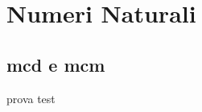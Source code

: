 \chapter{Numeri Naturali}
\label{cha:numerinaturali}
\section{mcd e mcm}
\label{sec:numnatmcmmcd}
\begin{esempiot} {}{}
prova
\tcblower
test
\end{esempiot}